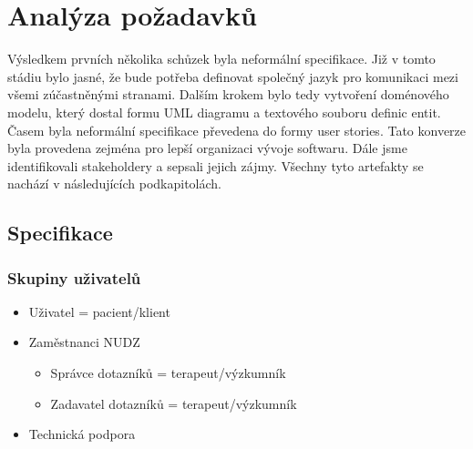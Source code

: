 \chapter{Analýza požadavků}\label{ch:analyza-pozadavku}

Výsledkem prvních několika schůzek byla neformální specifikace.
Již v tomto stádiu bylo jasné, že bude potřeba definovat společný jazyk pro komunikaci mezi všemi zúčastněnými stranami.
Dalším krokem bylo tedy vytvoření doménového modelu, který dostal formu UML diagramu a textového souboru definic entit.
Časem byla neformální specifikace převedena do formy user stories.
Tato konverze byla provedena zejména pro lepší organizaci vývoje softwaru.
Dále jsme identifikovali stakeholdery a sepsali jejich zájmy.
Všechny tyto artefakty se nachází v následujících podkapitolách.

\section{Specifikace}\label{sec:specifikace}

\subsection{Skupiny uživatelů}\label{subsec:skupiny-uzivatelu}

\begin{itemize}
\item
  Uživatel = pacient/klient

\item
  Zaměstnanci NUDZ

  \begin{itemize}
  \item
    Správce dotazníků = terapeut/výzkumník
  \item
    Zadavatel dotazníků = terapeut/výzkumník
  \end{itemize}
\item
  Technická podpora
\end{itemize}


